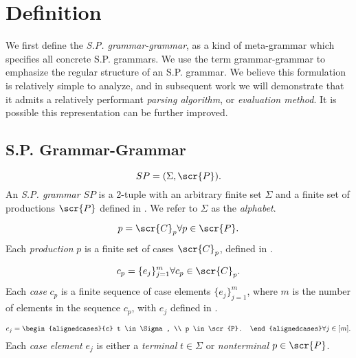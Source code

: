 \documentclass[10pt]{article}
\begin{document}
\section{Definition}
\label{sec:definition}
We first define the \textit{S.P. grammar-grammar}, as a kind of meta-grammar which specifies all concrete S.P. grammars. We use the term grammar-grammar to emphasize the regular structure of an S.P. grammar. We believe this formulation is relatively simple to analyze, and in subsequent work we will demonstrate that it admits a relatively performant \textit{parsing algorithm}, or \textit{evaluation method}. It is possible this representation can be further improved.

\subsection{S.P. Grammar-Grammar}
\label{sec:grammar-grammar}

\begin{equation}
  \label{eq:sp}
  SP = (\Sigma, \scr{P}).
\end{equation}
An \textit{S.P. grammar} $SP$ is a 2-tuple with an arbitrary finite set $\Sigma$ and a finite set of productions $\scr{P}$ defined in . We refer to $\Sigma$ as the \textit{alphabet}.

\begin{equation}
  \label{eq:p}
  p = \scr{C}_p \forall p \in \scr{P}.
\end{equation}
Each \textit{production} $p$ is a finite set of cases $\scr{C}_p$, defined in .

\begin{equation}
  \label{eq:cp}
  c_p = \{e_j\}_{j=1}^m \forall c_p \in \scr{C}_p.
\end{equation}
Each \textit{case} $c_p$ is a finite sequence of case elements $\{e_j\}_{j=1}^m$, where $m$ is the number of elements in the sequence $c_p$, with $e_j$ defined in .

\begin{equation}
  \label{eq:ej}
  e_j = \begin{alignedcases}{c}
    t \in \Sigma, \\
    p \in \scr{P}.
  \end{alignedcases} \forall j \in [m].
\end{equation}
Each \textit{case element} $e_j$ is either a \textit{terminal} $t \in \Sigma$ or \textit{nonterminal} $p \in \scr{P}$.
\end{document}
